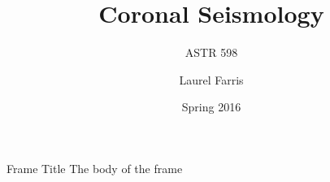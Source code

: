 \documentclass{beamer}
\title{Coronal Seismology}
\subtitle{ASTR 598}
\date{Spring 2016}
\author{Laurel Farris}
\begin{document}
\begin{frame}
    \titlepage
\end{frame}

\begin{frame}{Frame Title}
    The body of the frame
\end{frame}
\end{document}
